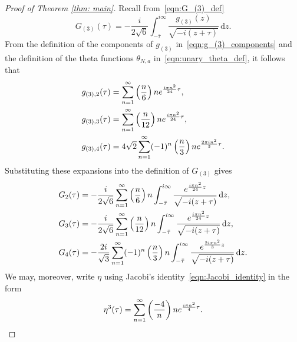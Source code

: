\documentclass[11pt,reqno]{amsart}
\renewcommand{\=}{\;=\;}
\theoremstyle{myremark}
\newcommand{\dd}{\mathrm{d}}
\begin{document}
\begin{proof}[Proof of Theorem \ref{thm: main}]
Recall from~\eqref{eqn:G_(3)_def}
\begin{equation*}
    G_{(3)}(\tau)= -\frac{i}{2\sqrt{6}}\int_{-\overline{\tau}}^{i\infty}\frac{g_{(3)}(z)}{\sqrt{-i(z+\tau)}}\,\dd z.
\end{equation*}
From the definition of the components of $g_{(3)}$ in~\eqref{eqn:g_(3)_components} and the definition of the theta functions $\theta_{N,a}$ in~\eqref{eqn:unary_theta_def}, it follows that
\begin{align*} 
&
g_{(3),2}(\tau) = \sum_{n=1}^\infty \left({n \over 6}\right) n e^{{i\pi n^2 \over 24}\tau}, \\
&
g_{(3),3}(\tau) = \sum_{n=1}^\infty \left({n \over 12}\right) n e^{{i\pi n^2 \over 24} \tau }, \\
&
g_{(3),4}(\tau) = 4\sqrt{2}\sum_{n=1}^\infty (-1)^n \left({n \over 3}\right) n e^{{2\pi i n^2 \over 3}\tau }. 
\end{align*}
Substituting these expansions into the definition of $G_{(3)}$ gives
\begin{align*}
G_{2}(\tau) &= -{i \over 2\sqrt{6}} \sum_{n=1}^\infty \left({n \over 6}\right) n \int_{-\bar{\tau}}^{i\infty} {e^{{i\pi n^2 \over 24}z} \over \sqrt{-i(z+\tau)}} \, \dd z, \\
G_{3}(\tau) &= -{i \over 2\sqrt{6}} \sum_{n=1}^\infty \left({n \over 12}\right) n \int_{-\bar{\tau}}^{i\infty} {e^{{i\pi n^2 \over 24}z} \over \sqrt{-i(z+\tau)}} \, \dd z, \\
G_{4}(\tau) &= -{2i \over \sqrt{3}} \sum_{n=1}^\infty (-1)^n \left({n \over 3}\right) n \int_{-\bar{\tau}}^{i\infty} {e^{{2i\pi n^2 \over 3}z} \over \sqrt{-i(z+\tau)}} \, \dd z.
\end{align*}
We may, moreover, write $\eta$ using Jacobi's identity~\eqref{eqn:Jacobi_identity} in the form
\[ \eta^3(\tau) = \sum_{n=1}^\infty \left({-4 \over n}\right) n e^{{i\pi n^2 \over 4}\tau}. 
\]


\end{proof}
\end{document}
